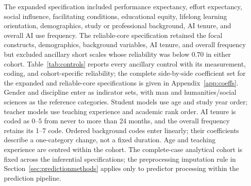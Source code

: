 \documentclass[sustainability,article,accept,moreauthors]{Definitions/mdpi}
\begin{document}
The expanded specification included performance expectancy, effort expectancy, social influence, facilitating conditions, educational equity, lifelong learning orientation, demographics, study or professional background, AI tenure, and overall AI use frequency. The reliable-core specification retained the focal constructs, demographics, background variables, AI tenure, and overall frequency but excluded ancillary short scales whose reliability was below  0.70 in either cohort. Table~\ref{tab:controls} reports every ancillary control with its measurement, coding, and cohort-specific reliability; the complete side-by-side coefficient set for the expanded and reliable-core specifications is given in Appendix~\ref{app:coeffs}. Gender and discipline enter as indicator sets, with man and humanities/social sciences as the reference categories. Student models use age and study year order; teacher models use teaching experience and academic rank order. AI tenure is coded as 0--5 from never to more than 24 months, and the overall frequency retains its 1--7 code. Ordered background codes enter linearly; their coefficients describe a one-category change, not a fixed duration. Age and teaching experience are centred within the cohort. The complete-case analytical cohort is fixed across the inferential specifications; the preprocessing imputation rule in Section~\ref{sec:predictionmethods} applies only to predictor processing within the prediction pipeline.
\end{document}

